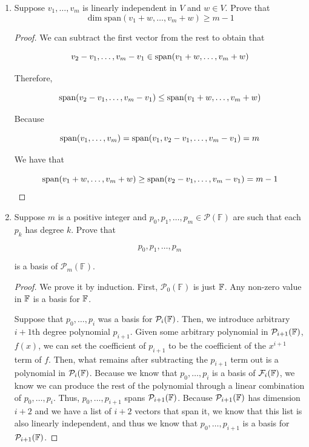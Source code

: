 \begin{enumerate}
            \item[8] Suppose $v_1, \ldots, v_m$ is linearly independent in $V$ and $w \in V$. Prove that
                $$\dim \text{span}(v_1 + w, \ldots, v_m + w) \geq m - 1$$
                
                \begin{proof}
                    We can subtract the first vector from the rest to obtain that 

                    $$v_2 - v_1, \dots, v_m - v_1 \in \text{span}(v_1 + w, \dots, v_m + w)$$

                    Therefore, 

                    $$\text{span}(v_2 - v_1, \dots, v_m - v_1) \leq \text{span}(v_1 + w, \dots, v_m + w)$$

                    Because 

                    $$\text{span}(v_1, \dots, v_m) = \text{span}(v_1, v_2 - v_1, \dots, v_m - v_1) = m$$

                    We have that 

                    $$\text{span}(v_1 + w, \dots, v_m + w) \geq \text{span}(v_2 - v_1, \dots, v_m - v_1) = m-1$$
                \end{proof}


            \item[9] Suppose $m$ is a positive integer and $p_0, p_1, \dots, p_m \in \mathcal P(\mathbb F)$ are such that each $p_k$ has degree $k$. Prove that
            

            \[p_0, p_1, \dots, p_m\]

            is a basis of \(\mathcal P_m(\mathbb F)\).

            \begin{proof}

                We prove it by induction. First, $\mathcal P_0(\mathbb F)$ is just $\mathbb{F}$. Any non-zero value in $\mathbb{F}$ is a basis for $\mathbb{F}$. 

                Suppose that $p_0, \dots, p_i$ was a basis for $\mathcal P_i(\mathbb{F})$. Then, we introduce arbitrary $i + 1$th degree polynomial $p_{i + 1}$. Given some arbitrary polynomial in $\mathcal P_{i + 1}(\mathbb{F})$, $f(x)$, we can set the coefficient of $p_{i + 1}$ to be the coefficient of the $x^{i + 1}$ term of $f$. Then, what remains after subtracting the $p_{i + 1}$ term out is a polynomial in $\mathcal P_{i}(\mathbb{F})$. Because we know that $p_0, \dots, p_i$ is a basis of $\mathcal F_i(\mathbb{F})$, we know we can produce the rest of the polynomial through a linear combination of $p_0, \dots, p_i$. Thus, $p_0, \dots, p_{i + 1}$ spans $\mathcal P_{i + 1}(\mathbb{F})$. Because $\mathcal P_{i + 1}(\mathbb{F})$ has dimension $i + 2$ and we have a list of $i + 2$ vectors that span it, we know that this list is also linearly independent, and thus we know that $p_0, \dots, p_{i + 1}$ is a basis for $\mathcal P_{i + 1}(\mathbb{F})$. 


\end{proof}
\end{enumerate}
